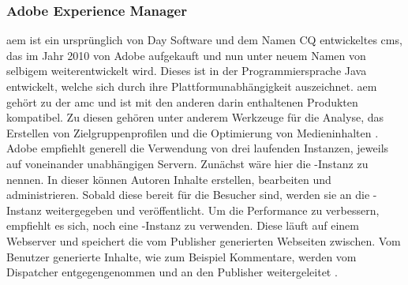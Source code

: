 \subsubsection{Adobe Experience Manager}
\label{sec:aem}

\acf{aem} ist ein ursprünglich von Day Software und dem Namen CQ entwickeltes \ac{cms}, das im Jahr 2010 von Adobe aufgekauft und nun unter neuem Namen von selbigem weiterentwickelt wird. Dieses ist in der Programmiersprache Java entwickelt, welche sich durch ihre Plattformunabhängigkeit auszeichnet. \ac{aem} gehört zu der \ac{amc} und ist mit den anderen darin enthaltenen Produkten kompatibel. Zu diesen gehören unter anderem Werkzeuge für die Analyse, das Erstellen von Zielgruppenprofilen und die Optimierung von Medieninhalten \cite[S. 1-2]{Incorporated2015}. \\
Adobe empfiehlt generell die Verwendung von drei laufenden Instanzen, jeweils auf voneinander unabhängigen Servern. Zunächst wäre hier die -Instanz zu nennen. In dieser können Autoren Inhalte erstellen, bearbeiten und administrieren. Sobald diese bereit für die Besucher sind, werden sie an die -Instanz weitergegeben und veröffentlicht. Um die Performance zu verbessern, empfiehlt es sich, noch eine -Instanz zu verwenden. Diese läuft auf einem Webserver und speichert die vom Publisher generierten Webseiten zwischen. Vom Benutzer generierte Inhalte, wie zum Beispiel Kommentare, werden vom Dispatcher entgegengenommen und an den Publisher weitergeleitet \cite[S. 1-3 f.]{Incorporated2015}.
















